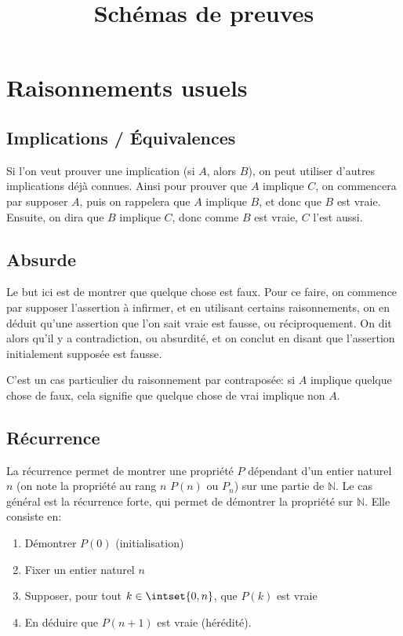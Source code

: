 \documentclass{scrartcl}
\title{Schémas de preuves}
\author{}
\date{}
\begin{document}
	\maketitle
	\section{Raisonnements usuels}
		\subsection{Implications / Équivalences}
			Si l'on veut prouver une implication (si $A$, alors $B$), 
			on peut utiliser d'autres implications déjà connues. 
			Ainsi pour prouver que $A$ implique $C$, on commencera par supposer $A$,
			puis on rappelera que $A$ implique $B$, et donc que $B$ est vraie. 
			Ensuite, on dira que $B$ implique $C$, donc comme $B$ est vraie, $C$ l'est aussi.

		\subsection{Absurde}
			Le but ici est de montrer que quelque chose est faux.
			Pour ce faire, on commence par supposer l'assertion à infirmer, 
			et en utilisant certains raisonnements, on en déduit qu'une assertion que l'on sait vraie est fausse,
			ou réciproquement. On dit alors qu'il y a contradiction, ou absurdité,
			et on conclut en disant que l'assertion initialement supposée est fausse.

			\rem C'est un cas particulier du raisonnement par contraposée: si $A$ implique quelque chose de faux,
			cela signifie que quelque chose de vrai implique non $A$.

		\subsection{Récurrence}
			La récurrence permet de montrer une propriété $P$ dépendant d'un entier naturel $n$ 
			(on note la propriété au rang $n$ $P(n)$ ou $P_n$) 
			sur une partie de $\mathbb{N}$.
			Le cas général est la récurrence forte, 
			qui permet de démontrer la propriété sur $\mathbb{N}$.
			Elle consiste en:
			\begin{enumerate}
				\item Démontrer $P(0)$ (initialisation)
				\item Fixer un entier naturel $n$
				\item Supposer, pour tout $k \in \intset{0,n}$, que $P(k)$ est vraie
				\item En déduire que $P(n+1)$ est vraie (hérédité).
			\end{enumerate}
\end{document}
